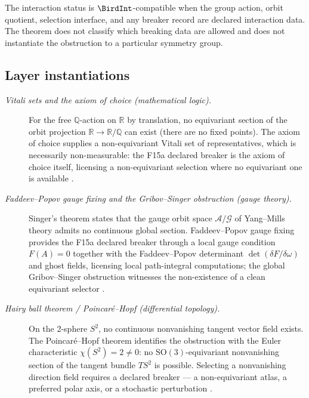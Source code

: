 \documentclass[11pt]{article}
\theoremstyle{definition}
\begin{document}
The interaction status is \(\BirdInt\)-compatible when the group
action, orbit quotient, selection interface, and any breaker record
are declared interaction data.  The theorem does not classify which
breaking data are allowed and does not instantiate the obstruction to
a particular symmetry group.

\subsection*{Layer instantiations}\label{layer-inst:F15a}

\begin{description}
\item[\emph{Vitali sets and the axiom of choice (mathematical
logic).}]
For the free \(\mathbb Q\)-action on \(\mathbb R\) by translation,
no equivariant section of the orbit projection
\(\mathbb R\to\mathbb R/\mathbb Q\) can exist (there are no fixed
points).  The axiom of choice supplies a non-equivariant Vitali
set of representatives, which is necessarily non-measurable: the
F15a declared breaker is the axiom of choice itself, licensing a
non-equivariant selection where no equivariant one is available
\citep{Vitali1905ProblemaMisura}.

\item[\emph{Faddeev--Popov gauge fixing and the Gribov--Singer
obstruction (gauge theory).}]
Singer's theorem states that the gauge orbit space
\(\mathcal A/\mathcal G\) of Yang--Mills theory admits no
continuous global section.  Faddeev--Popov gauge fixing provides
the F15a declared breaker through a local gauge condition
\(F(A)=0\) together with the Faddeev--Popov determinant
\(\det(\delta F/\delta\omega)\) and ghost fields, licensing local
path-integral computations; the global Gribov--Singer obstruction
witnesses the non-existence of a clean equivariant selector
\citep{FaddeevPopov1967YangMills}.

\item[\emph{Hairy ball theorem / Poincar{\'e}--Hopf (differential
topology).}]
On the 2-sphere \(S^2\), no continuous nonvanishing tangent vector
field exists.  The Poincar{\'e}--Hopf theorem identifies the
obstruction with the Euler characteristic
\(\chi(S^2)=2\neq 0\): no \(\mathrm{SO}(3)\)-equivariant
nonvanishing section of the tangent bundle \(TS^2\) is possible.
Selecting a nonvanishing direction field requires a declared
breaker --- a non-equivariant atlas, a preferred polar axis, or a
stochastic perturbation
\citep{Poincare1885CourbesEquationsDifferentielles}.


\end{description}
\end{document}
